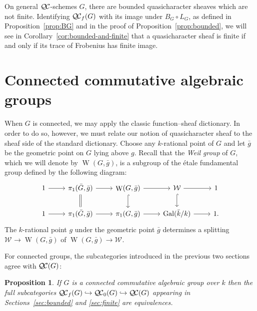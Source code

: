 \documentclass{amsart}
\theoremstyle{plain}
\newtheorem{proposition}[theorem]{Proposition}
\theoremstyle{definition}
\theoremstyle{remark}
\newcommand{\bFq}{\bar{k}}
\newcommand{\Fq}{k}
\newcommand{\Weil}[1]{\mathcal{W}_{#1}}
\DeclareMathOperator{\Gal}{Gal}
\DeclareMathOperator{\W}{W}
\newcommand{\QC}{{\mathcal{Q\hskip-0.8pt C}}}
\newcommand{\QCb}{{\QC_0}}
\newcommand{\QCf}{{\QC_f}}
\newcommand{\bg}{\bar{g}}
\newcommand{\bG}{\bar{G}}
\begin{document}
On general $\QC$-schemes $G$, there are bounded quasicharacter sheaves which are not finite.  Identifying
$\QCf(G)$ with its image under $B_G \circ L_G$, as defined in
Proposition~\ref{prop:BG} and in the proof of Proposition~\ref{prop:bounded},
we will see in Corollary~\ref{cor:bounded-and-finite} that
a quasicharacter sheaf is finite if and only if its trace of Frobenius has finite image.
 
\section{Connected commutative algebraic groups} \label{sec:connected}

When $G$ is connected, we may apply the classic function--sheaf dictionary.  In order to do so,
however, we must relate our notion of quasicharacter sheaf to the sheaf side of the standard dictionary.
Choose any $\Fq$-rational point of $G$ and let $\bg$ be the geometric point on $G$ lying above $g$.
Recall that the \emph{Weil group} of $G$, which we will denote by $\W(G,\bg)$, is a subgroup of the \'etale
fundamental group defined by the following diagram:
\[
 \begin{tikzcd}
 1 \rar & \ar[equal]{d} \pi_1(\bG, \bg) \rar & \W(G,\bg) \rar \dar[hook] & \Weil{} \rar \dar[hook] & 1 \\
 1 \rar &  \pi_1(\bG, \bg) \rar & \pi_1(G,\bg) \rar & \Gal(\bFq/\Fq) \rar & 1.
 \end{tikzcd}
\]
The $\Fq$-rational point $g$ under the geometric point $\bg$ determines a splitting
$\Weil{}\to \W(G,\bg)$ of $\W(G,\bg)\to \Weil{}$. 

For connected groups, the subcategories introduced in the previous two sections agree with $\QC(G)$:

\begin{proposition}\label{prop:connected}
  If $G$ is a connected commutative algebraic group over $\Fq$ then 
  the full subcategories $\QCf(G) \hookrightarrow \QCb(G) \hookrightarrow \QC(G)$ 
  appearing in Sections~\ref{sec:bounded} and \ref{sec:finite} are equivalences.
\end{proposition}
\end{document}
